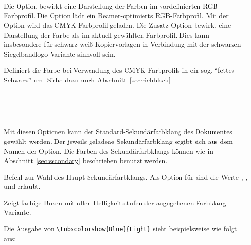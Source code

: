 \begin{Declaration}
  \\
  \\
  \\[1ex]
\end{Declaration}

Die Option  bewirkt eine Darstellung der Farben im vordefinierten
RGB-Farbprofil.
Die Option  lädt ein Beamer-optimierts RGB-Farbprofil.
Mit der Option  wird das CMYK-Farbprofil geladen.
Die Zusatz-Option  bewirkt eine Darstellung der Farbe
 als  im aktuell gewählten Farbprofil.
Dies kann insbesondere für schwarz-weiß Kopiervorlagen in Verbindung
mit der schwarzen Siegelbandlogo-Variante sinnvoll sein.


\begin{Declaration}
\end{Declaration}

Definiert die Farbe  bei Verwendung des CMYK-Farbprofils
in ein sog. "`fettes Schwarz"' um. Siehe dazu auch Abschnitt~\ref{sec:richblack}.

\begin{Declaration}
  \\
  \\
  \\
\end{Declaration}

Mit diesen Optionen kann der Standard-Sekundärfarbklang des Dokumentes gewählt
werden. Der jeweils geladene Sekundärfarbklang ergibt sich aus dem Namen
der Option.
Die Farben des Sekundärfarbklangs können wie in Abschnitt~\ref{sec:secondary}
beschrieben benutzt werden.

\begin{Declaration}
\end{Declaration}

Befehl zur Wahl des Haupt-Sekundärfarbklangs. Als Option für 
sind die Werte , ,  und 
erlaubt.

\begin{Declaration}
\end{Declaration}

Zeigt farbige Boxen mit allen Helligkeitsstufen der angegebenen Farbklang-Variante.
\begin{example}
 Die Ausgabe von \lstinline!\tubscolorshow{Blue}{Light}! sieht beispielsweise
 wie folgt aus:\\
 \hspace*{-1cm}
\end{example}

\fussy
